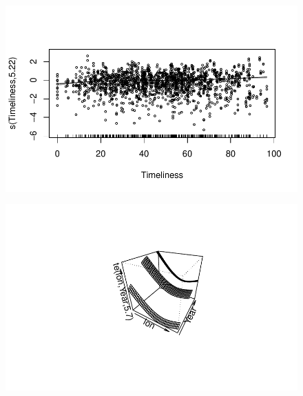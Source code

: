 \documentclass[
  letterpaper,
  DIV=11,
  numbers=noendperiod]{scrartcl}
\begin{document}
\begin{figure}[H]

{\centering \includegraphics{Group34Coursework_files/figure-pdf/unnamed-chunk-17-9.pdf}

}

\end{figure}

\begin{figure}[H]

{\centering \includegraphics{Group34Coursework_files/figure-pdf/unnamed-chunk-17-10.pdf}

}

\end{figure}
\end{document}
